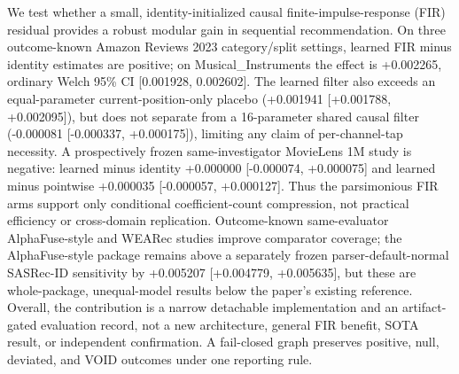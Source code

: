We test whether a small, identity-initialized causal finite-impulse-response (FIR) residual provides a robust modular gain in sequential recommendation.
On three outcome-known Amazon Reviews 2023 category/split settings, learned FIR minus identity estimates are positive; on Musical\_Instruments the effect is +0.002265, ordinary Welch 95\% CI [0.001928, 0.002602].
The learned filter also exceeds an equal-parameter current-position-only placebo (+0.001941 [+0.001788, +0.002095]), but does not separate from a 16-parameter shared causal filter (-0.000081 [-0.000337, +0.000175]), limiting any claim of per-channel-tap necessity.
A prospectively frozen same-investigator MovieLens 1M study is negative: learned minus identity +0.000000 [-0.000074, +0.000075] and learned minus pointwise +0.000035 [-0.000057, +0.000127].
Thus the parsimonious FIR arms support only conditional coefficient-count compression, not practical efficiency or cross-domain replication.
Outcome-known same-evaluator AlphaFuse-style and WEARec studies improve comparator coverage; the AlphaFuse-style package remains above a separately frozen parser-default-normal SASRec-ID sensitivity by +0.005207 [+0.004779, +0.005635], but these are whole-package, unequal-model results below the paper's existing reference.
Overall, the contribution is a narrow detachable implementation and an artifact-gated evaluation record, not a new architecture, general FIR benefit, SOTA result, or independent confirmation.
A fail-closed graph preserves positive, null, deviated, and VOID outcomes under one reporting rule.
